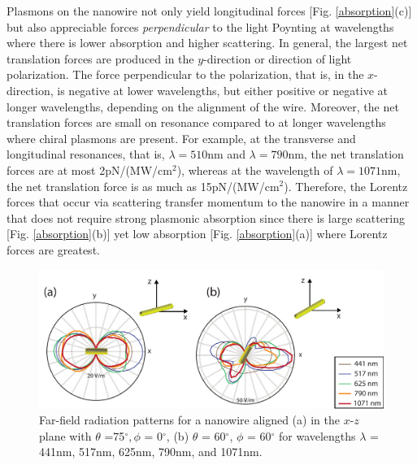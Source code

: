 Plasmons on the nanowire not only yield longitudinal forces [Fig. \ref{absorption}(c)] but also appreciable forces {\it perpendicular} to the light Poynting at wavelengths where there is lower absorption and higher scattering.  In general, the largest net translation forces are produced in the $y$-direction or direction of light polarization.  The force perpendicular to the polarization, that is, in the $x$-direction, is negative at lower wavelengths, but either positive or negative at longer wavelengths, depending on the alignment of the wire.  Moreover, the net translation forces are small on resonance compared to at longer wavelengths where chiral plasmons are present.  For example, at the transverse and longitudinal resonances, that is, $\lambda = 510$nm and $\lambda = 790$nm, the net translation forces are at most 2pN/(MW/cm$^2$), whereas at the wavelength of $\lambda = 1071$nm, the net translation force is as much as 15pN/(MW/cm$^2$). Therefore, the Lorentz forces that occur via scattering transfer momentum to the nanowire in a manner that does not require strong plasmonic absorption since there is large scattering [Fig. \ref{absorption}(b)] yet low absorption [Fig. \ref{absorption}(a)] where Lorentz forces are greatest.

\begin{figure}[!t]
\includegraphics[width = 1.0\textwidth]{CPLComp.pdf}
\caption{Far-field radiation patterns for a nanowire aligned (a) in the $x$-$z$ plane with $\theta$ =75$^\circ, \phi$ = 0$^\circ$, (b) $\theta$ = 60$^\circ$, $\phi$ = 60$^\circ$ for wavelengths $\lambda$ = 441nm, 517nm, 625nm, 790nm, and 1071nm.}\label{CPLComp}
\end{figure}
